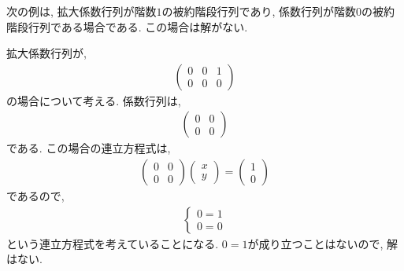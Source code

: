 次の例は,
拡大係数行列が階数$1$の被約階段行列であり,
係数行列が階数$0$の被約階段行列である場合である.
この場合は解がない.
\begin{example}
      \label{eg:eq:reduced:6}
  拡大係数行列が,
  \begin{align*}
    \begin{pmatrix}
      0&0&1\\0&0&0
    \end{pmatrix}
  \end{align*}
  の場合について考える.
  係数行列は,
  \begin{align*}
    \begin{pmatrix}
      0&0\\0&0
    \end{pmatrix}
  \end{align*}
  である.
  この場合の連立方程式は,
  \begin{align*}
    \begin{pmatrix}
      0&0\\0&0
    \end{pmatrix}
    \begin{pmatrix}x\\y\end{pmatrix}
      =
      \begin{pmatrix}
        1\\0
      \end{pmatrix}
  \end{align*}
  であるので,
  \begin{align*}
    \begin{cases}
      0=1\\
      0=0
    \end{cases}
  \end{align*}
  という連立方程式を考えていることになる.
  $0=1$が成り立つことはないので,
  解はない.
\end{example}

